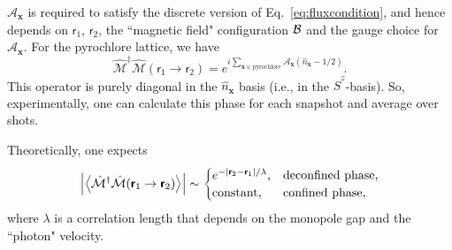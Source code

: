 \documentclass[twocolumn,superscriptaddress,amsmath,amssymb,aps,prx,nofootinbib]{revtex4-2}
\newcommand{\dual}[1]{\boldsymbol{\mathsf{#1}}}
\begin{document}
 $\mathcal{A}_{\bm{x}}$ is required to satisfy the discrete version of Eq.~\eqref{eq:fluxcondition}, and hence depends on $\dual{r}_1$, $\dual{r}_2$, the ``magnetic field" configuration $\vb{\mathcal{B}}$ and the gauge choice for $\mathcal{A}_{\bm{x}}$. For the pyrochlore lattice, we have
\begin{equation}\label{eq:monopoledecay}
    \hat{\mathcal{M}}^\dagger \hat{\mathcal{M}} (\dual{r}_1\rightarrow \dual{r}_2)= e^{i\sum_{\bm{x}\in \text{pyrochlore}}\mathcal{A}_{\bm{x}}  \left(\hat{n}_{\bm{x}}-1/2\right)}.
\end{equation}
This operator is purely diagonal in the $\hat{n}_{\bm{x}}$ basis (i.e., in the $\hat{S}^z$-basis). So, experimentally, one can calculate this phase for each snapshot and average over shots. 

Theoretically, one expects
\begin{equation} \label{eq:monopole_correlator_behavior}
    \abs{\expval{\hat{\mathcal{M}}^\dagger \hat{\mathcal{M}} (\dual{r}_1 \rightarrow \dual{r}_2)}} \sim \begin{cases}
    e^{-\abs{\dual{r}_2-\dual{r}_1}/\lambda}, &\text{deconfined phase,}\\
    \text{constant,} &\text{confined phase}, 
    \end{cases}
\end{equation}
where $\lambda$ is a correlation length that depends on the monopole gap and the ``photon" velocity. 
\end{document}
